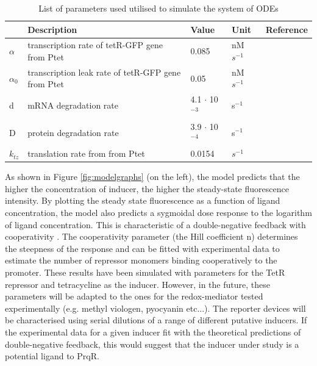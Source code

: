 \begin{table}[H]
\centering
\begin{tabular}{l|l|l|l|l}
\textbf{} & \textbf{Description} & \textbf{Value} & \textbf{Unit} & \textbf{Reference} \\ \hline
$\alpha$ & transcription rate of tetR-GFP gene from Ptet & 0.085 & nM $s^{-1}$ & \cite{Braun}\\ \hline
$\alpha_{0}$ & transcription leak rate of tetR-GFP gene from Ptet & 0.05 & nM $s^{-1}$ & \cite{Kelly2018} \\ \hline
d & mRNA degradation rate  & 4.1 $\cdot$ 10$^{−3}$ & s$^{-1}$  & \cite{Kelly2018}  \\ \hline
D & protein degradation rate & 3.9 $\cdot$ 10$^{−4}$ & s$^{-1}$  & \cite{Kelly2018}   \\ \hline
$k_{tz}$ & translation rate from from Ptet & 0.0154   & $s^{-1}$  & \cite{Kelly2018}  \\
\end{tabular}
\caption{List of parameters used utilised to simulate the system of ODEs}
\label{table:params}
\end{table}

As shown in Figure \ref{fig:modelgraphs} (on the left), the model predicts that the higher the concentration of inducer, the higher the steady-state fluorescence intensity. By plotting the steady state fluorescence as a function of ligand concentration, the model also predicts a sygmoidal dose response to the logarithm of ligand concentration. This is characteristic of a double-negative feedback with cooperativity \cite{Kelly2018}. The cooperativity parameter (the Hill coefficient n) determines the steepness of the response and can be fitted with experimental data to estimate the number of repressor monomers binding cooperatively to the promoter. These results have been simulated with parameters for the TetR repressor and tetracycline as the inducer. However, in the future, these parameters will be adapted to the ones for the redox-mediator tested experimentally (e.g. methyl viologen, pyocyanin etc...). The reporter devices will be characterised using serial dilutions of a range of different putative inducers. If the experimental data for a given inducer fit with the theoretical predictions of double-negative feedback, this would suggest that the inducer under study is a potential ligand to PrqR.

